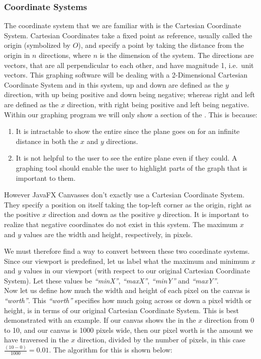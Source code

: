 \documentclass[../../../../../../../main.tex]{subfiles}
\begin{document}
\subsubsection{Coordinate Systems}
The coordinate system that we are familiar with is the Cartesian Coordinate System. Cartesian Coordinates take a fixed point as reference, usually called the origin (symbolized by $O$), and specify a point by taking the distance from the origin in $n$ directions, where $n$ is the dimension of the system. The directions are vectors, that are all perpendicular to each other, and have magnitude 1, i.e.\ unit vectors. This graphing software will be dealing with a 2-Dimensional Cartesian Coordinate System and in this system, up and down are defined as the $y$ direction, with up being positive and down being negative; whereas right and left are defined as the $x$ direction, with right being positive and left being negative. Within our graphing program we will only show a section of the \xyplane. This is because:
\begin{enumerate}
\item It is intractable to show the entire \xyplane since the plane goes on for an infinite distance in both the $x$ and $y$ directions.
\item It is not helpful to the user to see the entire plane even if they could. A graphing tool should enable the user to highlight parts of the graph that is important to them.
\end{enumerate}
However JavaFX Canvasses don't exactly use a Cartesian Coordinate System. They specify a position on itself taking the top-left corner as the origin, right as the positive $x$ direction and down as the positive $y$ direction. It is important to realize that negative coordinates do not exist in this system. The maximum $x$ and $y$ values are the width and height, respectively, in pixels.

We must therefore find a way to convert between these two coordinate systems. Since our viewport is predefined, let us label what the maximum and minimum $x$ and $y$ values in our viewport (with respect to our original Cartesian Coordinate System). Let these values be \textit{``minX''}, \textit{``maxX''}, \textit{``minY''} and \textit{``maxY''}.\\
Now let us define how much the width and height of each pixel on the canvas is \textit{``worth''}. This \textit{``worth''} specifies how much going across or down a pixel width or height, is in terms of our original Cartesian Coordinate System. This is best demonstrated with an example. If our canvas shows the \xyplane in the $x$ direction from 0 to 10, and our canvas is 1000 pixels wide, then our pixel worth is the amount we have traversed in the $x$ direction, divided by the number of pixels, in this case $\frac{(10-0)}{1000} = 0.01$. The algorithm for this is shown below:
\end{document}
